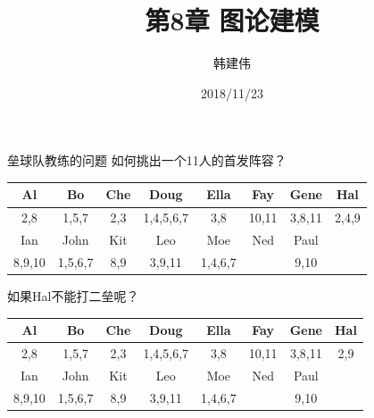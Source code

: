 \documentclass[UTF8]{ctexbeamer}
\title{第8章 图论建模}
\author{韩建伟}
\institute{
  信息学院\\
  \texttt{hanjianwei@zjgsu.edu.cn}
}
\date{2018/11/23}
\begin{document}
\begin{frame}[plain]
  \titlepage{}
\end{frame}

\begin{frame}{垒球队教练的问题}
  如何挑出一个11人的首发阵容？

  \begin{table}
    \centering
    \begin{tabular}{c|c|c|c|c|c|c|c}
      \hline
      Al & Bo & Che & Doug & Ella & Fay & Gene & Hal\\
      \hline
      2,8 & 1,5,7 & 2,3 & 1,4,5,6,7 & 3,8 & 10,11 & 3,8,11 & 2,4,9\\
      \hline
      Ian & John & Kit & Leo & Moe & Ned & Paul & \\
      \hline
      8,9,10 & 1,5,6,7 & 8,9 & 3,9,11 & 1,4,6,7 && 9,10 &\\
      \hline
    \end{tabular}
  \end{table}

  如果Hal不能打二垒呢？

  \begin{table}
    \centering
    \begin{tabular}{c|c|c|c|c|c|c|c}
      \hline
      Al & Bo & Che & Doug & Ella & Fay & Gene & Hal\\
      \hline
      2,8 & 1,5,7 & 2,3 & 1,4,5,6,7 & 3,8 & 10,11 & 3,8,11 & 2,9\\
      \hline
      Ian & John & Kit & Leo & Moe & Ned & Paul & \\
      \hline
      8,9,10 & 1,5,6,7 & 8,9 & 3,9,11 & 1,4,6,7 && 9,10 &\\
      \hline
    \end{tabular}
  \end{table}

\end{frame}
\end{document}
